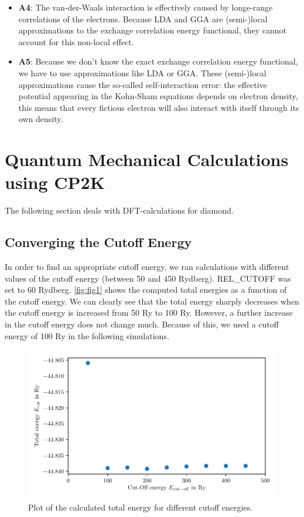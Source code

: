 \documentclass[a4paper,10pt,bibtotoc]{scrartcl}
\begin{document}
\begin{itemize}
 \item \textbf{A4}: The van-der-Waals interaction is effectively caused by longe-range correlations of the electrons.
 Because LDA and GGA are (semi-)local approximations to the exchange correlation energy functional, they cannot account for this non-local effect.
 
 \item \textbf{A5}: Because we don't know the exact exchange correlation energy functional, we have to use approximations like LDA or GGA. 
 These (semi-)local approximations cause the so-called self-interaction error: the effective potential appearing in the Kohn-Sham equations depends on electron density, this means that every fictious electron will also interact with itself through its own density.
\end{itemize}


\section{Quantum Mechanical Calculations using CP2K}
The following section deals with DFT-calculations for diamond.

\subsection{Converging the Cutoff Energy}
In order to find an appropriate cutoff energy, we ran calculations with different values of the cutoff energy (between 50 and 450 Rydberg). REL\_CUTOFF was set to 60 Rydberg. \autoref{fig:fig1} shows the computed total energies as a function of the cutoff energy. We can clearly see that the total energy sharply decreases when the cutoff energy is increased from 50 Ry to 100 Ry. However, a further increase in the cutoff energy does not change much. Because of this, we used a cutoff energy of 100 Ry in the following simulations.

\begin{figure}[h]
\centering
 \includegraphics[width=\textwidth]{Figure_cutoff_energy.pdf}
 \caption{Plot of the calculated total energy for different cutoff energies.}
 \label{fig:fig1}
\end{figure}
\end{document}
